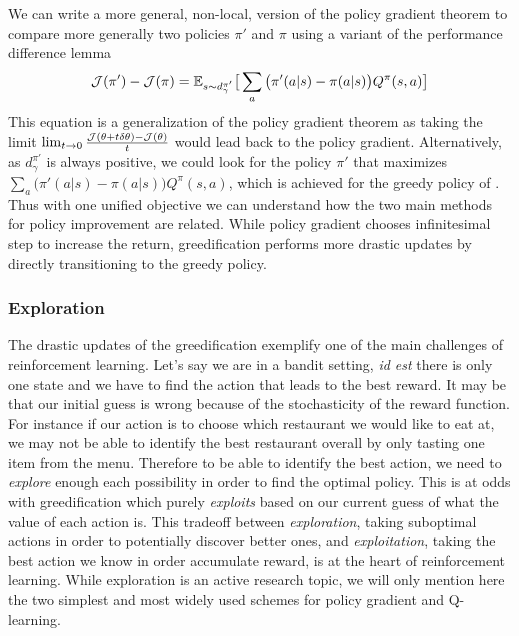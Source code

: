 We can write a more general, non-local, version of the policy gradient theorem to compare more generally two policies $\pi'$ and $\pi$ using a variant of the performance difference lemma~\citep{kakade2002approximately}
\begin{equation}
    {\mathcal{J}}(\pi') - {\mathcal{J}}(\pi) = \mathbb{E}_{s \sim d^{\pi'}_\gamma} \big[ \sum_a \big(\pi'(a|s)-\pi(a|s)\big) Q^\pi(s,a)\big]
\end{equation}
This equation is a generalization of the policy gradient theorem as taking the limit $\lim_{t\to 0} \frac{{\mathcal{J}}(\theta+t \delta \theta)-{\mathcal{J}}(\theta)}{t}$ would lead back to the policy gradient. Alternatively, as $d^{\pi'}_\gamma$ is always positive, we could look for the policy $\pi'$ that maximizes $ \sum_a \big(\pi'(a|s)-\pi(a|s)\big) Q^\pi(s,a)$, which is achieved for the greedy policy of . Thus with one unified objective we can understand how the two main methods for policy improvement are related. While policy gradient chooses infinitesimal step to increase the return, greedification performs more drastic updates by directly transitioning to the greedy policy.

\subsubsection{Exploration}
\label{subsubsec:exploration}
The drastic updates of the greedification exemplify one of the main challenges of reinforcement learning. Let's say we are in a bandit setting, \emph{id est} there is only one state and we have to find the action that leads to the best reward. It may be that our initial guess is wrong because of the stochasticity of the reward function. For instance if our action is to choose which restaurant we would like to eat at, we may not be able to identify the best restaurant overall by only tasting one item from the menu. Therefore to be able to identify the best action, we need to \emph{explore} enough each possibility in order to find the optimal policy. This is at odds with greedification which purely \emph{exploits} based on our current guess of what the value of each action is. This tradeoff between \emph{exploration}, taking suboptimal actions in order to potentially discover better ones, and \emph{exploitation}, taking the best action we know in order accumulate reward, is at the heart of reinforcement learning. While exploration is an active research topic, we will only mention here the two simplest and most widely used schemes for policy gradient and Q-learning.

